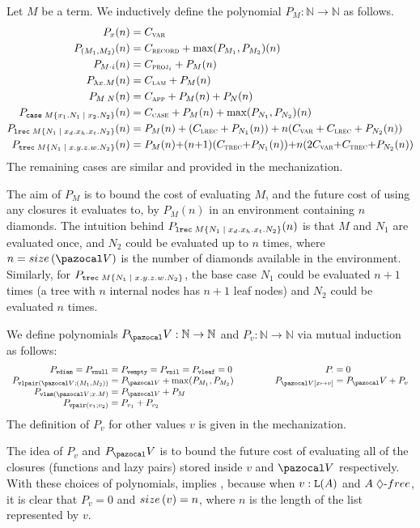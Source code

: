 \begin{definition}
Let $M$ be a \lfplplus term. We inductively define the polynomial $P_M : \mathbb N \to \mathbb N$ as follows.
{\upshape
\begin{align*}
P_{x}(n) &= \Cvar \\
P_{\tmrecord{M_1}{M_2}}(n) &= \Crecord + \max(P_{M_1}, P_{M_2})(n) \\
P_{\tmproj{i}{M}}(n) &= \Cproj{i} + P_M(n) \\
P_{\tmlam{x}{M}}(n) &= \Clam + P_M(n) \\
P_{\tmapp{M}{N}}(n) &= \Capp + P_M(n) + P_N(n) \\
P_{\tmcase{M}{x_1}{N_1}{x_2}{N_2}}(n) &= \Ccase + P_M(n) + \max(P_{N_1}, P_{N_2})(n) \\
P_{\tmrec{M}{N_1}{x_d}{x_h}{x_t}{N_2}}(n) &= P_M(n) + (\Crec + P_{N_1}(n)) 
 + n (\Cvar + \Crec + P_{N_2}(n)) \\
P_{\tmtrec{M}{N_1}{x}{y}{z}{w}{N_2}}(n) &= P_M(n) {+} (n {+} 1) (\Ctrec {+} P_{N_1}(n)) 
 {+} n (2\Cvar {+} \Ctrec {+} P_{N_2}(n))
\end{align*}
}
The remaining cases are similar and provided in the mechanization.
\end{definition}

The aim of $P_M$ is to bound the cost of evaluating $M$, and the future cost of using any closures it evaluates to, by $P_M(n)$ in an environment containing $n$ diamonds. The intuition behind $P_{\tmrec{M}{N_1}{x_d}{x_h}{x_t}{N_2}}(n)$ is that $M$ and $N_1$ are evaluated once, and $N_2$ could be evaluated up to $n$ times, where $n = \envsize{\env}$ is the number of diamonds available in the environment. Similarly, for $P_{\mathtt{trec} \; M \left\{ N_1 \; | \; x . y . z . w . N_2 \right\}}$, the base case $N_1$ could be evaluated $n + 1$ times (a tree with $n$ internal nodes has $n + 1$ leaf nodes) and $N_2$ could be evaluated $n$ times.

\begin{definition}
We define polynomials $P_\env : \mathbb N \to \mathbb N$ and $P_v : \mathbb N \to \mathbb N$ via mutual induction as follows:
\[
\begin{array}{r@{\;=\;}l@{\hspace{4.5em}}r@{\;=\;}l}
  P_{\vdiam} = P_{\vnull} & P_{\vempty} = P_{\vnil} = P_{\vleaf} = 0 &
  P_{\envnil} & 0 \\
 P_{\vrecord{\env}{M_1}{M_2}} & P_{\env} + \max(P_{M_1}, P_{M_2}) &
  P_{\envcons{\env}{x}{v}} & P_\env + P_v \\
P_{\vlam{\env}{x}{M}} & P_{\env} + P_M \\
P_{\vpair{v_1}{v_2}} & P_{v_1} + P_{v_2} 
\end{array}
\]
The definition of $P_v$ for other values $v$ is given in the mechanization.
\end{definition}
The idea of  $P_v$ and $P_\env$ is to bound the future cost of evaluating all of the closures (functions and lazy pairs) stored inside $v$ and $\env$ respectively. With these choices of polynomials,  implies , because when $v : \tplist{A}$ and $\dfree{A}$, it is clear that $P_v = 0$ and $\valsize{v} = n$, where $n$ is the length of the list represented by $v$.

